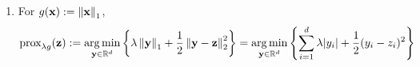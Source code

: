 \documentclass{article}
\begin{document}
\begin{enumerate}[label=1.I.\arabic*]
    \begin{fact}
        If $D, E \succeq 0$, then $\lambda_{\max}(D \otimes E) = \lambda_{\max}(D)\lambda_{\max}(E)$.
        \label{fact2}
    \end{fact}
    
    Using Fact \ref{fact2}, we have that
    \begin{align}
         \lambda_{\max} (\Sigma_i \otimes \aa_i \aa_i^T) = \lambda_{\max} (\Sigma_i ) \lambda_{\max}(\aa_i \aa_i^T) \leq \frac{1}{2}\lambda_{\max}(\aa_i \aa_i^T) \leq \frac{\norm{\aa_i}^2}{2}
    \end{align}
    
    \begin{lemma}
        For two matrices $A, B \in \R^{n\times n}$, $\lambda_{\max}(A+B)\leq \lambda_{\max}(A)+\lambda_{\max}(B)$
        \label{lemma:1}
    \end{lemma}
    \begin{proof}
        We can express the maximum eigenvalue of the matrix $A+B$ as
        \begin{align}
            \lambda_{\max}(A+B)=\max_{\xx \in \R^n }\frac{\xx ^T (A+B)\xx}{\norm{\xx}^2} \leq \max_{\xx \in \R^n }\frac{\xx ^T A\xx}{\norm{\xx}^2}+\max_{\xx \in \R^n }\frac{\xx ^T B\xx}{\norm{\xx}^2}=\lambda_{\max}(A)+\lambda_{\max}(B)
        \end{align}
    \end{proof}
    
    Finally, applying Lemma \ref{lemma:1} $n-1$ times,
    \begin{align}
        \lambda_{\max}(\nabla^2 f) \leq \sum_{i=1}^n \frac{\norm{\aa_i}^2}{2} := \frac{\norm{A}^2_F}{2}=L
    \end{align}
    
    \item For $g(\mathbf{x}):=\left\lVert\mathbf{x}\right\rVert_1$,
    \begin{align}
        \text{prox}_{\lambda g}(\mathbf{z}) := \operatorname*{arg\,min}_{\mathbf{y} \in \mathbb{R}^d} \left\lbrace \lambda \left\lVert\mathbf{y}\right\rVert_1 + \frac{1}{2} \left\lVert\mathbf{y} - \mathbf{z}\right\rVert^2_2\right\rbrace = \operatorname*{arg\,min}_{\mathbf{y} \in \mathbb{R}^d} \left\lbrace \sum_{i=1}^d \lambda |y_i| + \frac{1}{2} (y_i-z_i)^2\right\rbrace
    \end{align}
    

\end{enumerate}
\end{document}
